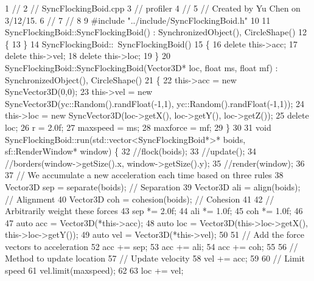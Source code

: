 \begin{DoxyCodeInclude}
1 \textcolor{comment}{//}
2 \textcolor{comment}{//  SyncFlockingBoid.cpp}
3 \textcolor{comment}{//  profiler}
4 \textcolor{comment}{//}
5 \textcolor{comment}{//  Created by Yu Chen on 3/12/15.}
6 \textcolor{comment}{//}
7 \textcolor{comment}{//}
8 
9 \textcolor{preprocessor}{#include "../include/SyncFlockingBoid.h"}
10 
11 SyncFlockingBoid::SyncFlockingBoid() : SynchronizedObject(), CircleShape()
12 \{
13 \}
14 SyncFlockingBoid::~SyncFlockingBoid()
15 \{
16     \textcolor{keyword}{delete} this->acc;
17     \textcolor{keyword}{delete} this->vel;
18     \textcolor{keyword}{delete} this->loc;
19 \}
20 SyncFlockingBoid::SyncFlockingBoid(Vector3D* loc, \textcolor{keywordtype}{float} ms, \textcolor{keywordtype}{float} mf) : SynchronizedObject(), CircleShape()
21 \{
22     this->acc = \textcolor{keyword}{new} SyncVector3D(0,0);
23     this->vel = \textcolor{keyword}{new} SyncVector3D(yc::Random().randFloat(-1,1), yc::Random().randFloat(-1,1));
24     this->loc = \textcolor{keyword}{new} SyncVector3D(loc->getX(), loc->getY(), loc->getZ());
25     \textcolor{keyword}{delete} loc;
26     r = 2.0f;
27     maxspeed = ms;
28     maxforce = mf;
29 \}
30 
31 \textcolor{keywordtype}{void} SyncFlockingBoid::run(std::vector<SyncFlockingBoid*>* boids, sf::RenderWindow* window) \{
32     \textcolor{comment}{//flock(boids);}
33     \textcolor{comment}{//update();}
34     \textcolor{comment}{//borders(window->getSize().x, window->getSize().y);}
35     \textcolor{comment}{//render(window);}
36     
37     \textcolor{comment}{// We accumulate a new acceleration each time based on three rules}
38     Vector3D sep = separate(boids);   \textcolor{comment}{// Separation}
39     Vector3D ali = align(boids);      \textcolor{comment}{// Alignment}
40     Vector3D coh = cohesion(boids);   \textcolor{comment}{// Cohesion}
41     
42     \textcolor{comment}{// Arbitrarily weight these forces}
43     sep *= 2.0f;
44     ali *= 1.0f;
45     coh *= 1.0f;
46     
47     \textcolor{keyword}{auto} acc = Vector3D(*this->acc);
48     \textcolor{keyword}{auto} loc = Vector3D(this->loc->getX(), this->loc->getY());
49     \textcolor{keyword}{auto} vel = Vector3D(*this->vel);
50     
51     \textcolor{comment}{// Add the force vectors to acceleration}
52     acc += sep;
53     acc += ali;
54     acc += coh;
55     
56     \textcolor{comment}{// Method to update location}
57     \textcolor{comment}{// Update velocity}
58     vel += acc;
59     
60     \textcolor{comment}{// Limit speed}
61     vel.limit(maxspeed);
62     
63     loc += vel;

\end{DoxyCodeInclude}
